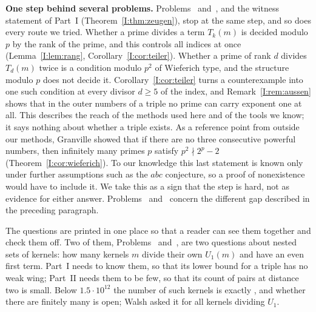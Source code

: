 \medskip
\noindent\textbf{One step behind several problems.} Problems~ and~, and the witness
statement of Part~I (Theorem~\ref{I:thm:zeugen}), stop at the same step, and so does every route we tried. Whether a prime divides a term
$T_k(m)$ is decided modulo $p$ by the rank of the prime, and this controls all indices at once (Lemma~\ref{I:lem:rang},
Corollary~\ref{I:cor:teiler}). Whether a prime of rank $d$ divides $T_d(m)$ twice is a condition modulo $p^2$ of Wieferich type, and the
structure modulo $p$ does not decide it. Corollary~\ref{I:cor:teiler} turns a counterexample into one such condition at every divisor
$d \ge 5$ of the index, and Remark~\ref{I:rem:aussen} shows that in the outer numbers of a triple no prime can carry exponent one at all.
This describes the reach of the methods used here and of the tools we know; it says nothing about whether a triple exists. As a
reference point from outside our methods, Granville \cite{Granville1986} showed that if there are no three consecutive powerful numbers,
then infinitely many primes $p$ satisfy $p^2 \nmid 2^p - 2$ (Theorem~\ref{I:cor:wieferich}). To our knowledge this last statement is
known only under further assumptions such as the $abc$ conjecture, so a proof of nonexistence would have to include it. We take this as
a sign that the step is hard, not as evidence for either answer.
Problems~ and~ concern the different gap described in the preceding paragraph.

\inwords The questions are printed in one place so that a reader can see them together and check them off. Two of them, Problems~
and~, are two questions about nested sets of kernels: how many kernels $m$ divide their own $U_1(m)$ and have an even first term.
Part~I needs to know them, so that its lower bound for a triple has no weak wing; Part~II needs them to be few, so that its count of pairs at
distance two is small. Below $1.5 \cdot 10^{12}$ the number of such kernels is exactly , and whether there are finitely
many is open; Walsh asked it for all kernels dividing $U_1$.
